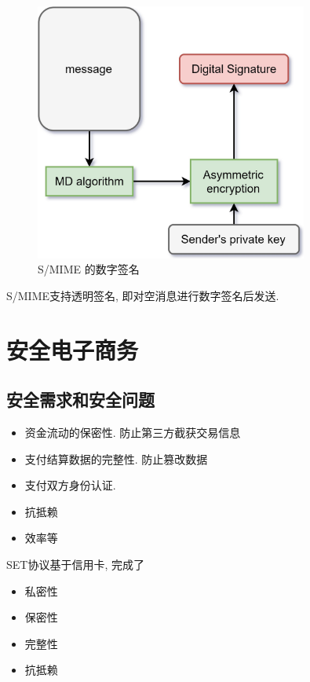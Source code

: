 \documentclass{ctexart}
\begin{document}
    \begin{figure}[ht!]
    \centering
    \includegraphics[height=0.4\textheight,width=0.8\textwidth,keepaspectratio]{s-mime-ds.jpg}
    \caption{S/MIME 的数字签名}
    \label{s-mime-ds}
    \end{figure}

    S/MIME支持透明签名, 即对空消息进行数字签名后发送.

\section{安全电子商务}
\subsection{安全需求和安全问题}
    \begin{itemize}
        \item 资金流动的保密性. 防止第三方截获交易信息
        \item 支付结算数据的完整性. 防止篡改数据
        \item 支付双方身份认证.
        \item 抗抵赖
        \item 效率等
    \end{itemize}
    SET协议基于信用卡, 完成了\begin{itemize}
        \item 私密性
        \item 保密性
        \item 完整性
        \item 抗抵赖
    \end{itemize}
\end{document}
